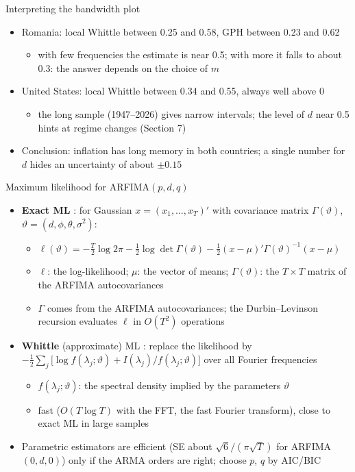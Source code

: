 \begin{frame}{Interpreting the bandwidth plot}
\itemsize{\small}
\begin{itemize}
    \item Romania: local Whittle between 0.25 and 0.58, GPH between 0.23 and 0.62
    \begin{itemize}
        \item with few frequencies the estimate is near 0.5; with more it falls to about 0.3: the answer depends on the choice of $m$
    \end{itemize}
    \item United States: local Whittle between 0.34 and 0.55, always well above 0
    \begin{itemize}
        \item the long sample (1947--2026) gives narrow intervals; the level of $d$ near 0.5 hints at regime changes (Section 7)
    \end{itemize}
    \item Conclusion: inflation has long memory in both countries; a single number for $d$ hides an uncertainty of about $\pm 0.15$
\end{itemize}
\end{frame}

\begin{frame}{Maximum likelihood for ARFIMA$(p,d,q)$}
\itemsize{\footnotesize}
\begin{itemize}
    \item \textbf{Exact ML} : for Gaussian $x = (x_1, \dots, x_T)'$ with covariance matrix $\Gamma(\vartheta)$, $\vartheta = (d, \phi, \theta, \sigma^2)$:
    \begin{itemize}
        \item $\ell(\vartheta) = -\frac{T}{2}\log 2\pi - \frac12\log\det\Gamma(\vartheta) - \frac12 (x - \mu)'\Gamma(\vartheta)^{-1}(x - \mu)$
        \item $\ell$: the log-likelihood; $\mu$: the vector of means; $\Gamma(\vartheta)$: the $T \times T$ matrix of the ARFIMA autocovariances
        \item $\Gamma$ comes from the ARFIMA autocovariances; the Durbin--Levinson recursion evaluates $\ell$ in $O(T^2)$ operations
    \end{itemize}
    \item \textbf{Whittle} (approximate) ML : replace the likelihood by $-\frac12\sum_j\bigl[\log f(\lambda_j;\vartheta) + I(\lambda_j)/f(\lambda_j;\vartheta)\bigr]$ over all Fourier frequencies
    \begin{itemize}
        \item $f(\lambda_j;\vartheta)$: the spectral density implied by the parameters $\vartheta$
        \item fast ($O(T\log T)$ with the FFT, the fast Fourier transform), close to exact ML in large samples
    \end{itemize}
    \item Parametric estimators are efficient (SE about $\sqrt{6}/(\pi\sqrt T)$ for ARFIMA$(0,d,0)$) only if the ARMA orders are right; choose $p$, $q$ by AIC/BIC
\end{itemize}
\end{frame}

